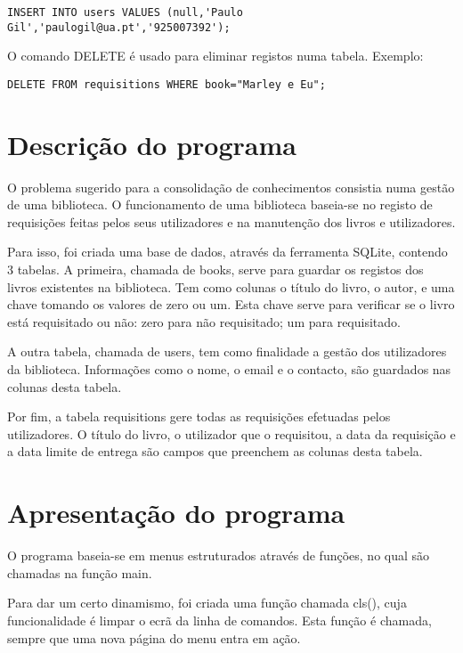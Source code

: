 \documentclass[11pt,openright,oneside]{report}
\begin{document}
\begin{verbatim}
INSERT INTO users VALUES (null,'Paulo Gil','paulogil@ua.pt','925007392');
\end{verbatim}
O comando DELETE é usado para eliminar registos numa tabela.
Exemplo:

\begin{verbatim}
DELETE FROM requisitions WHERE book="Marley e Eu";
\end{verbatim}

\chapter{Descrição do programa}
\label{chap.descricao}

O problema sugerido para a consolidação de conhecimentos consistia numa gestão de uma biblioteca. O funcionamento de uma biblioteca baseia-se no registo de requisições feitas pelos seus utilizadores e na manutenção dos livros e utilizadores.

Para isso, foi criada uma base de dados, através da ferramenta SQLite, contendo 3 tabelas. A primeira, chamada de books, serve para guardar os registos dos livros existentes na biblioteca. Tem como colunas o título do livro, o autor, e uma chave tomando os valores de zero ou um. Esta chave serve para verificar se o livro está requisitado ou não: zero para não requisitado; um para requisitado.
	
A outra tabela, chamada de users, tem como finalidade a gestão dos utilizadores da biblioteca. Informações como o nome, o email e o contacto, são guardados nas colunas desta tabela.

Por fim, a tabela requisitions gere todas as requisições efetuadas pelos utilizadores. O título do livro, o utilizador que o requisitou, a data da requisição e a data limite de entrega são campos que preenchem as colunas desta tabela.

\chapter{Apresentação do programa}
\label{chap.apresentacao}

O programa baseia-se em menus estruturados através de funções, no qual são chamadas na função main.

Para dar um certo dinamismo, foi criada uma função chamada cls(), cuja funcionalidade é limpar o ecrã da linha de comandos. Esta função é chamada, sempre que uma nova página do menu entra em ação.
\end{document}
